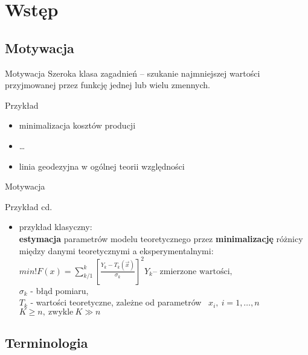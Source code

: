 \section{Wstęp}

\subsection{Motywacja}

  \begin{frame}{Motywacja}
    Szeroka klasa zagadnień -- szukanie najmniejszej wartości
    przyjmowanej przez funkcję jednej lub wielu zmennych.

    \begin{exampleblock}{Przykład}
      \begin{itemize}
        \item minimalizacja kosztów producji
        \item \ldots
        \item linia geodezyjna w ogólnej teorii względności
      \end{itemize}
    \end{exampleblock}
  \end{frame}

  \begin{frame}{Motywacja}
    \begin{exampleblock}{Przykład cd.}
      \begin{itemize}
        \item przykład klasyczny:\\
        \textbf{estymacja} parametrów modelu teoretycznego
        przez \textbf{minimalizację} różnicy między danymi
        teoretycznymi a eksperymentalnymi:\\
        $
          min!F(x) = \sum_{k/1}^{k} \left[ \frac{Y_k - T_k(\vec x)}{\sigma_k}
          \right] ^2 Y_k \text{-- zmierzone wartości,}
        $ \\
        $ \sigma_k $ - błąd pomiaru,\\
        $ T_k $ - wartości teoretyczne, zależne od parametrów~
        $ x_i{,}\ i=1{,} \dots {,}n $ \\
        $ K \geq n{,}\ \text{zwykle}\ K \gg n $
      \end{itemize}
    \end{exampleblock}
  \end{frame}

\subsection{Terminologia}

